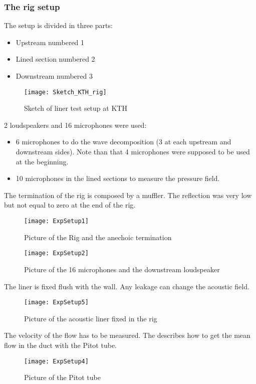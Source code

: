 \subsubsection{The rig setup}
The setup is divided in three parts: 
\begin{itemize}
    \item Upstream numbered 1
    \item Lined section numbered 2
    \item Downstream numbered 3
\end{itemize}
\begin{figure}[H] \centering
    \texttt{[image: Sketch\_KTH\_rig]}
    \caption{Sketch of liner test setup at KTH}
\end{figure}
2 loudspeakers and 16 microphones were used:
\begin{itemize}
    \item 6 microphones to do the wave decomposition (3 at each upstream and downstream sides). Note than that 4 microphones were supposed to be used at the beginning.
    \item 10 microphones in the lined sections to measure the pressure field.
\end{itemize}
The termination of the rig is composed by a muffler. The reflection was very low but not equal to zero at the end of the rig.
\begin{figure}[H] \centering
    \texttt{[image: ExpSetup1]}
    \caption{Picture of the Rig and the anechoic termination}
\end{figure}
\begin{figure}[H] \centering
    \texttt{[image: ExpSetup2]}
    \caption{Picture of the 16 microphones and the downstream loudspeaker}
\end{figure}
\noindent The liner is fixed flush with the wall. Any leakage can change the acoustic field.
\begin{figure}[H] \centering
    \texttt{[image: ExpSetup5]}
    \caption{Picture of the acoustic liner fixed in the rig}
\end{figure}
\noindent The velocity of the flow has to be measured. The  describes how to get the mean flow in the duct with the Pitot tube.
\begin{figure}[H] \centering
    \texttt{[image: ExpSetup4]}
    \caption{Picture of the Pitot tube}
\end{figure}

